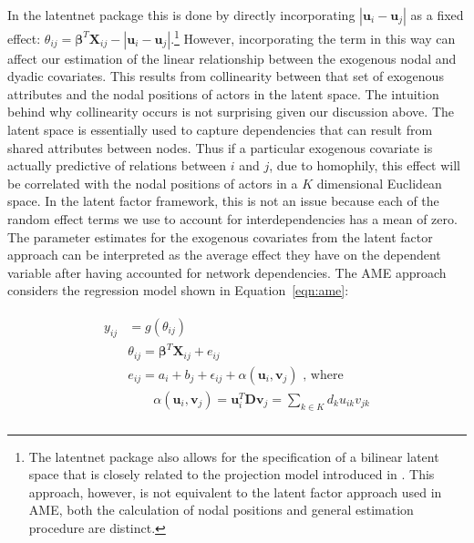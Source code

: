 \documentclass[12pt,pdflatex]{elsarticle}
\newcommand{\pkg}[1]{{\fontseries{b}\selectfont #1}}
\begin{document}
In the \pkg{latentnet} package this is done by directly incorporating $|\textbf{u}_{i} - \textbf{u}_{j}|$ as a fixed effect: $\theta_{ij} = \bm\beta^{T} \mathbf{X}_{ij} - |\textbf{u}_{i} - \textbf{u}_{j}|$.\footnote{The \pkg{latentnet} package also allows for the specification of a bilinear latent space that is closely related to the projection model introduced in \citet{hoff:etal:2002}. This approach, however, is not equivalent to the latent factor approach used in AME, both the calculation of nodal positions and general estimation procedure are distinct.} However, incorporating the term in this way can affect our estimation of the linear relationship between the exogenous nodal and dyadic covariates. This results from collinearity between that set of exogenous attributes and the nodal positions of actors in the latent space. The intuition behind why collinearity occurs is not surprising given our discussion above. The latent space is essentially used to capture dependencies that can result from shared attributes between nodes. Thus if a particular exogenous covariate is actually predictive of relations between $i$ and $j$, due to homophily, this effect will be correlated with the nodal positions of actors in a $K$ dimensional Euclidean space. In the latent factor framework, this is not an issue because each of the random effect terms we use to account for interdependencies has a mean of zero. The parameter estimates for the exogenous covariates from the latent factor approach can be interpreted as the average effect they have on the dependent variable after having accounted for network dependencies. The AME approach considers the regression model shown in Equation~\ref{eqn:ame}:

\begin{align}
\begin{aligned}
	y_{ij} &= g(\theta_{ij}) \\ 
	&\theta_{ij} = \bm\beta^{T} \mathbf{X}_{ij} + e_{ij} \\
	&e_{ij} = a_{i} + b_{j}  + \epsilon_{ij} + \alpha(\textbf{u}_{i}, \textbf{v}_{j}) \text{  , where } \\
	&\qquad \alpha(\textbf{u}_{i}, \textbf{v}_{j}) = \textbf{u}_{i}^{T} \textbf{D} \textbf{v}_{j} = \sum_{k \in K} d_{k} u_{ik} v_{jk} \\ 
\label{eqn:ame}
\end{aligned}
\end{align}
\end{document}
